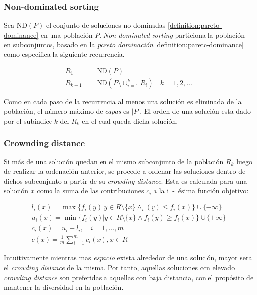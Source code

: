 
\subsubsection{Non-dominated sorting}\label{section:ndsorting}

Sea $\text{ND}(P)$ el conjunto de soluciones no dominadas \ref{definition:pareto-dominance} en una población $P$.
\emph{Non-dominated sorting} particiona la población en subconjuntos, basado en la \emph{pareto dominación} \ref{definition:pareto-dominance} como especifica la siguiente recurrencia.

\begin{align}
    R_1 &= \text{ND}(P) \\
    R_{k+1} &= \text{ND}(P \setminus \cup_{i=1}^k R_i) \quad k = 1,2, \dots
\end{align}

Como en cada paso de la recurrencia al menos una solución es eliminada de la población, el número máximo de \emph{capas} es $|P|$.
El orden de una solución esta dado por el subíndice $k$ del $R_k$ en el cual queda dicha solución.

\subsubsection{Crownding distance}\label{section:crowding-distance}

Si más de una solución quedan en el mismo subconjunto de la población $R_k$ luego de realizar la ordenación anterior, se procede a ordenar las soluciones dentro de dichos subconjunto a partir de su \emph{crowding distance}.
Esta es calculada para una solución $x$ como la suma de las contribuciones $c_i$ a la i~-~ésima función objetivo:

\begin{align}
    l_i(x) = \max \{ f_i(y) | y \in R \setminus \{x\} \wedge_i(y) \leq f_i(x) \} \cup \{-\infty\} \\
    u_i(x) = \min \{ f_i(y) | y \in R \setminus \{x\} \wedge f_i(y) \geq f_i(x) \} \cup \{+\infty\} \\
    c_i(x) = u_i - l_i, \quad i = 1, \dots, m \\
    c(x)   = \frac{1}{m} \sum_{i=1}^m c_i(x), x \in R
\end{align}

Intuitivamente mientras mas \textit{espacio} exista alrededor de una solución, mayor sera el \emph{crowding distance} de la misma.
Por tanto, aquellas soluciones con elevado \emph{crowding distance} son preferidas a aquellas con baja distancia, con el propósito de mantener la diversidad en la población.

